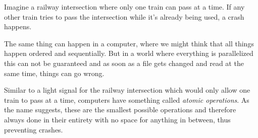 
Imagine a railway intersection where only one train can pass at a time. If any other train tries to pass the intersection while it's already being used, a crash happens.

The same thing can happen in a computer, where we might think that all things happen ordered and sequentially. But in a world where everything is parallelized this can not be guaranteed and as soon as a file gets changed and read at the same time, things can go wrong.

Similar to a light signal for the railway intersection which would only allow one train to pass at a time, computers have something called \emph{atomic operations}. As the name suggests, these are the smallest possible operations and therefore always done in their entirety with no space for anything in between, thus preventing crashes.

